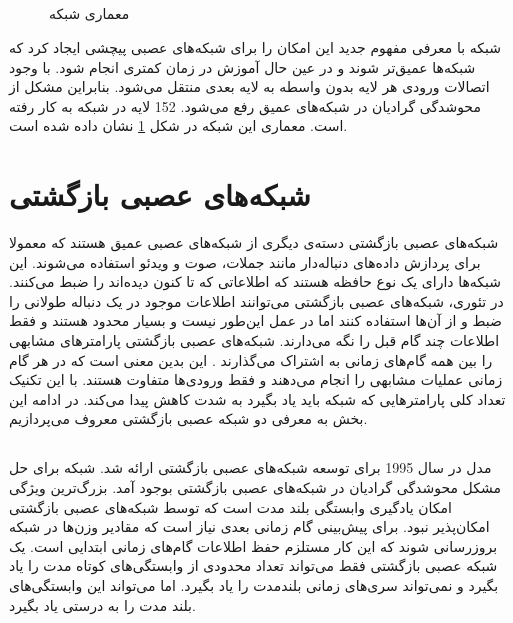 \subsection{}
	\begin{figure}
		\caption[معماری شبکه ]{معماری شبکه 
			\cite{10CNN}}
		\label{fig:ResNet}
	\end{figure}
	شبکه
	\cite{he2016deep}
	با معرفی مفهوم جدید
	این امکان را برای شبکه‌های عصبی پیچشی ایجاد کرد که شبکه‌ها عمیق‌تر شوند و در عین حال آموزش در زمان کمتری انجام شود. با وجود اتصالات 
	ورودی هر لایه بدون واسطه به لایه بعدی منتقل می‌شود. بنابراین مشکل از محوشدگی گرادیان
	 در شبکه‌های عمیق رفع می‌شود. 152 لایه در شبکه 
	به کار رفته است. معماری این شبکه در شکل 
	\ref{fig:ResNet}
	نشان داده شده است.

\section{شبکه‌های عصبی بازگشتی}
	شبکه‌های عصبی بازگشتی
	دسته‌ی دیگری از شبکه‌های عصبی عمیق هستند که معمولا برای پردازش داده‌های دنباله‌دار مانند جملات، صوت و ویدئو استفاده می‌شوند. این شبکه‌ها دارای یک نوع حافظه هستند که اطلاعاتی که تا کنون دیده‌اند را ضبط می‌کنند. در تئوری، شبکه‌های عصبی بازگشتی می‌توانند اطلاعات موجود در یک دنباله طولانی را ضبط و از آن‌ها استفاده کنند اما در عمل این‌طور نیست و بسیار محدود هستند ‌و فقط اطلاعات چند گام قبل را نگه می‌دارند. شبکه‌های عصبی بازگشتی پارامترهای مشابهی را بین همه گام‌های زمانی به اشتراک می‌گذارند . این بدین معنی است که در هر گام زمانی عملیات مشابهی را انجام می‌دهند و فقط ورودی‌ها متفاوت هستند. با این تکنیک تعداد کلی پارامتر‌هایی که شبکه باید یاد بگیرد به شدت کاهش پیدا می‌کند. در ادامه این بخش به معرفی دو شبکه عصبی بازگشتی معروف می‌پردازیم.
	
\subsection{}
	مدل 
	 \cite{hochreiter1997long}
	در سال 1995 برای توسعه شبکه‌های عصبی بازگشتی ارائه شد. شبکه 
	برای حل مشکل محوشدگی گرادیان در شبکه‌های عصبی بازگشتی بوجود آمد. بزرگ‌ترین ویژگی 
	 امکان یادگیری وابستگی بلند مدت است که توسط شبکه‌های عصبی بازگشتی امکان‌پذیر نبود. برای پیش‌بینی گام زمانی بعدی نیاز است که مقادیر وزن‌ها در شبکه بروزرسانی شوند که این کار مستلزم حفظ اطلاعات گام‌های زمانی ابتدایی است. یک شبکه عصبی بازگشتی فقط می‌تواند تعداد محدودی از وابستگی‌های کوتاه مدت را یاد بگیرد و نمی‌تواند سری‌های زمانی بلندمدت را یاد بگیرد. اما 
	 می‌تواند این وابستگی‌های بلند مدت را به درستی یاد بگیرد.
	 
